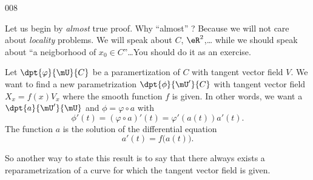 \begin{corrige}{008}

Let us begin by \emph{almost} true proof. Why ``almost'' ? Because we will not care about \emph{locality} problems. We will speak about $C$, $\eR^2$,\ldots{} while we should speak about ``a neigborhood of $x_0\in C$''\ldots You should do it as an exercise.

Let $\dpt{ \varphi }{ \mU }{ C }$ be a paramertization of $C$ with tangent vector field $V$. We want to find a new parametrization $\dpt{ \phi }{ \mU' }{ C }$ with tangent vector field $X_x=f(x)V_x$ where the smooth function $f$ is given. In other words, we want a $\dpt{ a }{ \mU' }{ \mU }$ and $\phi=\varphi\circ a$ with
\[ 
  \phi'(t)=(\varphi\circ a)'(t)=\varphi'(a(t))a'(t).
\]
The function $a$ is the solution of the differential equation
\[ 
  a'(t)=f\big( a(t) \big).
\]

So another way to state this result is to say that there always exists a reparametrization of a curve for which the tangent vector field is given.

\end{corrige}
